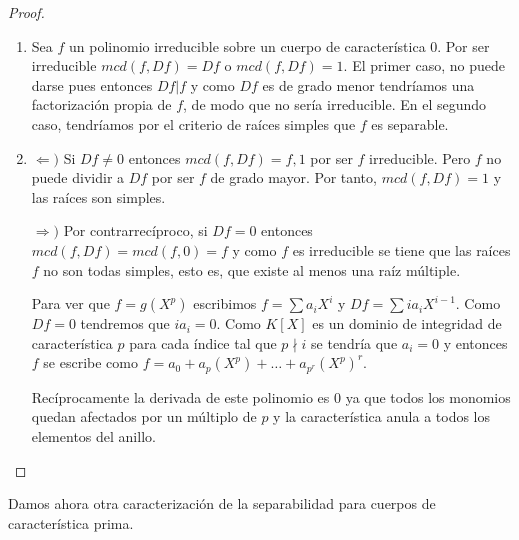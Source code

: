 \begin{proof}
\begin{enumerate}
\item Sea $f$ un polinomio irreducible sobre un cuerpo de característica 0. Por ser irreducible $mcd(f,Df) = Df$ o $mcd(f,Df) = 1$. El primer caso, no puede darse pues entonces $Df|f$ y como $Df$ es de grado menor tendríamos una factorización propia de $f$, de modo que no sería irreducible. En el segundo caso, tendríamos por el criterio de raíces simples que $f$ es separable. 

\item $\Leftarrow)$ Si $Df \neq 0$ entonces $mcd(f,Df) = f,1$ por ser $f$ irreducible. Pero $f$ no puede dividir a $Df$ por ser $f$ de grado mayor. Por tanto, $mcd(f,Df) = 1$ y las raíces son simples.  

$\Rightarrow)$ Por contrarrecíproco, si $Df = 0$ entonces $mcd(f,Df) = mcd(f,0) = f$ y como $f$ es irreducible se tiene que las raíces $f$ no son todas simples, esto es, que existe al menos una raíz múltiple. 

Para ver que $f = g(X^p)$ escribimos $f = \sum a_iX^i$ y $Df = \sum ia_iX^{i-1}$. Como $Df = 0$ tendremos que $ia_i = 0$. Como $K[X]$ es un dominio de integridad de característica $p$ para cada índice tal que $p \nmid i$ se tendría que $a_i = 0$ y entonces $f$ se escribe como $f = a_0 + a_p(X^p) + \ldots + a_{p^r}(X^p)^r$. 

Recíprocamente la derivada de este polinomio es $0$ ya que todos los monomios quedan afectados por un múltiplo de $p$ y la característica anula a todos los elementos del anillo. 
\end{enumerate}
\end{proof}

Damos ahora otra caracterización de la separabilidad para cuerpos de característica prima. 

